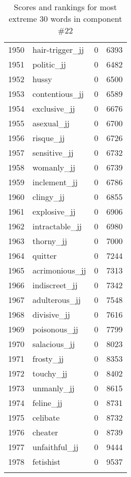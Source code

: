 \begin{longtable}[!htbp]{| rlr@{.}l |}
    1950 & hair-trigger\_jj & 0 & 6393 \\
    1951 & politic\_jj & 0 & 6482 \\
    1952 & hussy & 0 & 6500 \\
    1953 & contentious\_jj & 0 & 6589 \\
    1954 & exclusive\_jj & 0 & 6676 \\
    1955 & asexual\_jj & 0 & 6700 \\
    1956 & risque\_jj & 0 & 6726 \\
    1957 & sensitive\_jj & 0 & 6732 \\
    1958 & womanly\_jj & 0 & 6739 \\
    1959 & inclement\_jj & 0 & 6786 \\
    1960 & clingy\_jj & 0 & 6855 \\
    1961 & explosive\_jj & 0 & 6906 \\
    1962 & intractable\_jj & 0 & 6980 \\
    1963 & thorny\_jj & 0 & 7000 \\
    1964 & quitter & 0 & 7244 \\
    1965 & acrimonious\_jj & 0 & 7313 \\
    1966 & indiscreet\_jj & 0 & 7342 \\
    1967 & adulterous\_jj & 0 & 7548 \\
    1968 & divisive\_jj & 0 & 7616 \\
    1969 & poisonous\_jj & 0 & 7799 \\
    1970 & salacious\_jj & 0 & 8023 \\
    1971 & frosty\_jj & 0 & 8353 \\
    1972 & touchy\_jj & 0 & 8402 \\
    1973 & unmanly\_jj & 0 & 8615 \\
    1974 & feline\_jj & 0 & 8731 \\
    1975 & celibate & 0 & 8732 \\
    1976 & cheater & 0 & 8739 \\
    1977 & unfaithful\_jj & 0 & 9444 \\
    1978 & fetishist & 0 & 9537 \\
    \hline
    \caption{Scores and rankings for most extreme 30 words in component \#22} \\
\end{longtable}
